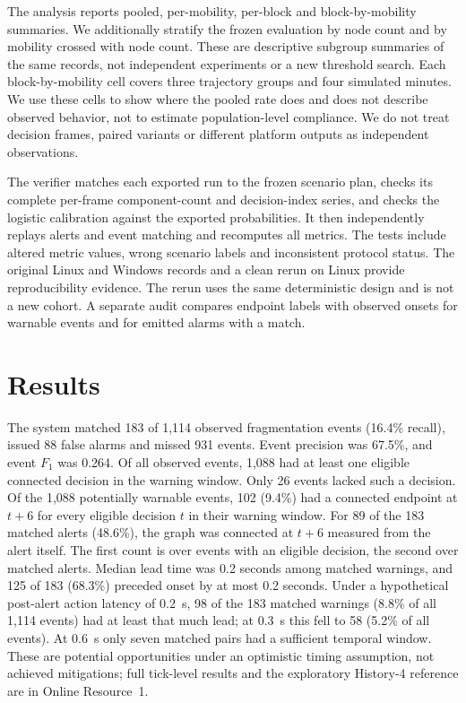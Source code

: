 \documentclass[10pt,a4paper]{article}
\begin{document}
The analysis reports pooled, per-mobility, per-block and block-by-mobility summaries. We additionally stratify the frozen evaluation by node count and by mobility crossed with node count. These are descriptive subgroup summaries of the same records, not independent experiments or a new threshold search. Each block-by-mobility cell covers three trajectory groups and four simulated minutes. We use these cells to show where the pooled rate does and does not describe observed behavior, not to estimate population-level compliance. We do not treat decision frames, paired variants or different platform outputs as independent observations.

The verifier matches each exported run to the frozen scenario plan, checks its complete per-frame component-count and decision-index series, and checks the logistic calibration against the exported probabilities. It then independently replays alerts and event matching and recomputes all metrics. The tests include altered metric values, wrong scenario labels and inconsistent protocol status. The original Linux and Windows records and a clean rerun on Linux provide reproducibility evidence. The rerun uses the same deterministic design and is not a new cohort. A separate audit compares endpoint labels with observed onsets for warnable events and for emitted alarms with a match.

\section{Results}\label{sec:results}

The system matched 183 of 1,114 observed fragmentation events (16.4\% recall), issued 88 false alarms and missed 931 events. Event precision was 67.5\%, and event \(F_1\) was 0.264. Of all observed events, 1,088 had at least one eligible connected decision in the warning window. Only 26 events lacked such a decision. Of the 1,088 potentially warnable events, 102 (9.4\%) had a connected endpoint at \(t+6\) for every eligible decision \(t\) in their warning window. For 89 of the 183 matched alerts (48.6\%), the graph was connected at \(t+6\) measured from the alert itself. The first count is over events with an eligible decision, the second over matched alerts. Median lead time was 0.2 seconds among matched warnings, and 125 of 183 (68.3\%) preceded onset by at most 0.2 seconds. Under a hypothetical post-alert action latency of 0.2~s, 98 of the 183 matched warnings (8.8\% of all 1,114 events) had at least that much lead; at 0.3~s this fell to 58 (5.2\% of all events). At 0.6~s only seven matched pairs had a sufficient temporal window. These are potential opportunities under an optimistic timing assumption, not achieved mitigations; full tick-level results and the exploratory History-4 reference are in Online Resource~1.
\end{document}
